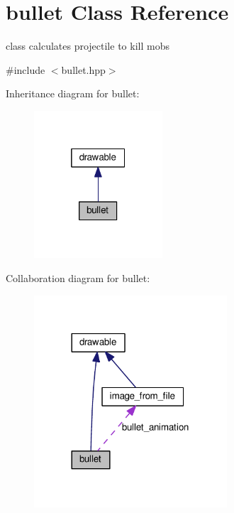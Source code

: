 \hypertarget{classbullet}{}\section{bullet Class Reference}
\label{classbullet}


class calculates projectile to kill mobs  




{\ttfamily \#include $<$bullet.\+hpp$>$}



Inheritance diagram for bullet\+:\nopagebreak
\begin{figure}[H]
\begin{center}
\leavevmode
\includegraphics[width=136pt]{classbullet__inherit__graph}
\end{center}
\end{figure}


Collaboration diagram for bullet\+:\nopagebreak
\begin{figure}[H]
\begin{center}
\leavevmode
\includegraphics[width=204pt]{classbullet__coll__graph}
\end{center}
\end{figure}
